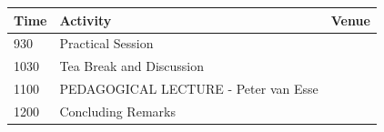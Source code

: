 \documentclass[12pt,]{book}
\theoremstyle{definition}
\theoremstyle{definition}
\theoremstyle{remark}
\begin{document}
\begin{longtable}[]{@{}lll@{}}
\toprule
\begin{minipage}[b]{0.09\columnwidth}\raggedright\strut
Time\strut
\end{minipage} & \begin{minipage}[b]{0.35\columnwidth}\raggedright\strut
Activity\strut
\end{minipage} & \begin{minipage}[b]{0.09\columnwidth}\raggedright\strut
Venue\strut
\end{minipage}\tabularnewline
\midrule
\endhead
\begin{minipage}[t]{0.09\columnwidth}\raggedright\strut
930\strut
\end{minipage} & \begin{minipage}[t]{0.35\columnwidth}\raggedright\strut
Practical Session\strut
\end{minipage} & \begin{minipage}[t]{0.09\columnwidth}\raggedright\strut
\strut
\end{minipage}\tabularnewline
\begin{minipage}[t]{0.09\columnwidth}\raggedright\strut
1030\strut
\end{minipage} & \begin{minipage}[t]{0.35\columnwidth}\raggedright\strut
Tea Break and Discussion\strut
\end{minipage} & \begin{minipage}[t]{0.09\columnwidth}\raggedright\strut
\strut
\end{minipage}\tabularnewline
\begin{minipage}[t]{0.09\columnwidth}\raggedright\strut
1100\strut
\end{minipage} & \begin{minipage}[t]{0.35\columnwidth}\raggedright\strut
PEDAGOGICAL LECTURE - Peter van Esse\strut
\end{minipage} & \begin{minipage}[t]{0.09\columnwidth}\raggedright\strut
\strut
\end{minipage}\tabularnewline
\begin{minipage}[t]{0.09\columnwidth}\raggedright\strut
1200\strut
\end{minipage} & \begin{minipage}[t]{0.35\columnwidth}\raggedright\strut
Concluding Remarks\strut
\end{minipage} & \begin{minipage}[t]{0.09\columnwidth}\raggedright\strut
\strut
\end{minipage}\tabularnewline
\bottomrule
\end{longtable}
\end{document}
